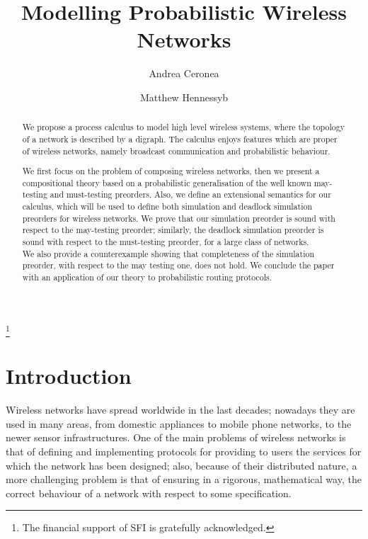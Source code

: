 \documentclass{LMCS}
\begin{document}
\title[Modelling Probabilistic Wireless Networks]{Modelling Probabilistic Wireless Networks}

\author[A.~Cerone]{Andrea Cerone\rsuper a}
\address{{\lsuper a}IMDEA Software Institute, Madrid, Spain}
\author[M.~Hennessy]{Matthew Hennessy\rsuper b}
\address{{\lsuper b}School of Computer Science and Statistics\\ Trinity College Dublin\\Ireland}
\thanks{{}The financial support of SFI is gratefully acknowledged.}

\begin{abstract}
  We propose a process calculus to model high level wireless systems, where the 
  topology of a network is described by a digraph. The calculus enjoys  
  features which are proper of wireless networks, namely broadcast 
  communication and probabilistic behaviour.

  We first focus on the problem of composing wireless networks, then we 
  present a compositional theory based on a probabilistic generalisation of the well 
  known may-testing and must-testing preorders. Also, we define an extensional semantics 
  for our calculus, which will be used to define both simulation and deadlock simulation 
  preorders for wireless networks. We 
  prove that our simulation preorder is sound with respect to 
  the may-testing preorder; similarly, the deadlock simulation preorder is 
  sound with respect to the must-testing preorder, for a large class of networks.\\
  We also provide a counterexample showing that completeness of 
  the simulation preorder, with respect to the may testing one, does not hold. 
  We conclude the paper with an application of our theory to probabilistic 
  routing protocols.
\end{abstract}

\maketitle




\section{Introduction}
\label{sec:intro}
Wireless networks have spread worldwide in the last decades; nowadays they are used in many areas, from domestic appliances to mobile phone networks, to the newer sensor infrastructures.
One of the main problems of wireless networks is 
that of defining and implementing protocols for providing to users the services 
for which the network has been designed; also, because of their distributed nature, 
a more challenging problem is that of ensuring in a rigorous, mathematical way, 
the correct behaviour of a network with respect to some specification.
\end{document}
